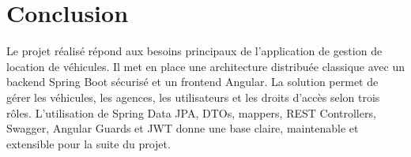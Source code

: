 \documentclass[12pt,a4paper]{article}
\begin{document}
\section{Conclusion}

Le projet réalisé répond aux besoins principaux de l'application de gestion de location de véhicules.
Il met en place une architecture distribuée classique avec un backend Spring Boot sécurisé et un frontend Angular.
La solution permet de gérer les véhicules, les agences, les utilisateurs et les droits d'accès selon trois rôles.
L'utilisation de Spring Data JPA, DTOs, mappers, REST Controllers, Swagger, Angular Guards et JWT donne une base claire, maintenable et extensible pour la suite du projet.
\end{document}
